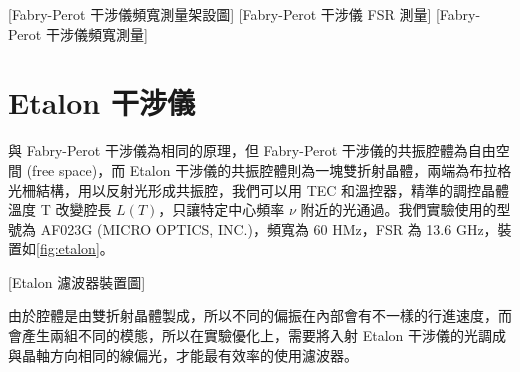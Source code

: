\documentclass[class=NCU_thesis, crop=false]{standalone}
\begin{document}
[Fabry-Perot 干涉儀頻寬測量架設圖]
[Fabry-Perot 干涉儀 FSR 測量]
[Fabry-Perot 干涉儀頻寬測量]

\clearpage
\section{Etalon 干涉儀}
\label{section:etalon}
與 Fabry-Perot 干涉儀為相同的原理，但 Fabry-Perot 干涉儀的共振腔體為自由空間 (free space)，而 Etalon 干涉儀的共振腔體則為一塊雙折射晶體，兩端為布拉格光柵結構，用以反射光形成共振腔，我們可以用 TEC 和溫控器，精準的調控晶體溫度 T 改變腔長 $L(T)$，只讓特定中心頻率 $\nu$ 附近的光通過。我們實驗使用的型號為 AF023G (MICRO OPTICS, INC.)，頻寬為 60 HMz，FSR 為 13.6 GHz，裝置如\cref{fig:etalon}。

[Etalon 濾波器裝置圖]

由於腔體是由雙折射晶體製成，所以不同的偏振在內部會有不一樣的行進速度，而會產生兩組不同的模態，所以在實驗優化上，需要將入射 Etalon 干涉儀的光調成與晶軸方向相同的線偏光，才能最有效率的使用濾波器。
\end{document}
